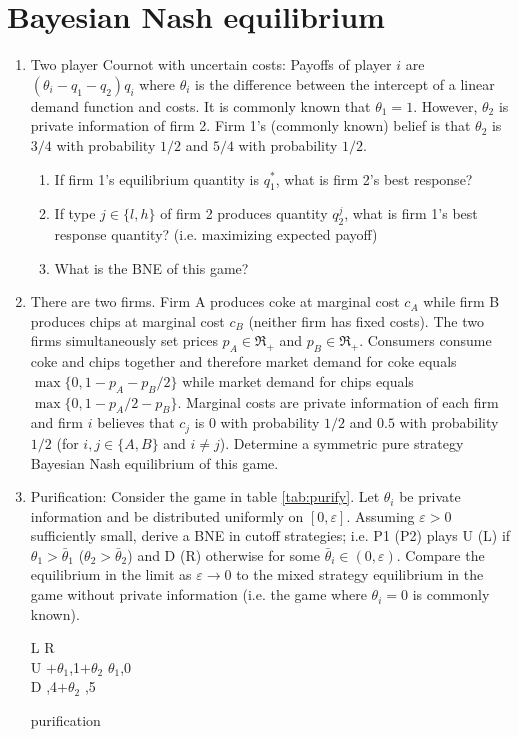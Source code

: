 \documentclass[a4paper,12pt]{article}
\begin{document}
\section{Bayesian Nash equilibrium}
\label{sec:Bayes-nash-eq}
\begin{enumerate}
\item Two player Cournot with uncertain costs: Payoffs of player $i$ are $(\theta _i-q_1-q_2)q_i$ where $\theta _i$ is the difference between the intercept of a linear demand function and costs. It is commonly known that $\theta _1=1$. However, $\theta _2$ is private information of firm 2. Firm 1's (commonly known) belief is that $\theta _2$ is $3/4$ with probability $1/2$ and $5/4$ with probability $1/2$.
  \begin{enumerate}
  \item If firm 1's equilibrium quantity is $q_1^*$, what is firm 2's best response?
  \item If type $j\in\{l,h\}$ of firm 2 produces quantity $q_2^j$, what is firm 1's best response quantity? (i.e. maximizing expected payoff)
    \item What is the BNE of this game?
    \end{enumerate}
\item There are two firms. Firm A produces coke at marginal cost $c_A$ while firm B produces chips at marginal cost $c_B$ (neither firm has fixed costs). The two firms simultaneously set prices $p_A\in\Re_+$ and $p_B\in\Re_+$. Consumers consume coke and chips together and therefore market demand for coke equals $\max\{0,1-p_A-p_B/2\}$ while market demand for chips equals $\max\{0,1-p_A/2-p_B\}$. Marginal costs are private information of each firm and firm $i$ believes that $c_j$ is 0 with probability $1/2$ and $0.5$ with probability $1/2$ (for $i,j\in\{A,B\}$ and $i\neq j$). Determine a symmetric pure strategy Bayesian Nash equilibrium of this game.     
\item Purification: Consider the game in table \ref{tab:purify}. Let $\theta _i$ be private information and be distributed uniformly on $[0 ,\varepsilon ]$. Assuming $\varepsilon >0$ sufficiently small, derive a BNE in cutoff strategies; i.e. P1 (P2) plays U (L) if $\theta _1>\bar{\theta }_1$ ($\theta _2>\bar{\theta }_2$) and D (R) otherwise for some $\bar \theta_i\in(0,{\varepsilon })$. Compare the equilibrium in the limit as $\varepsilon \rightarrow 0$ to the mixed strategy equilibrium in the game without private information (i.e. the game where $\theta _i=0$ is commonly known). 
     \begin{table}[h]
\centering
 \begin{game}{2}{2}
       \> L  \>R\\ %
U   $+\theta_1$,1$+\theta _2$    \> $\theta_1$,0   \\
D  ,4$+\theta _2$    ,5
\end{game}  
\caption{purification}
\label{tab:purify}
\end{table}
\end{enumerate}
\end{document}
